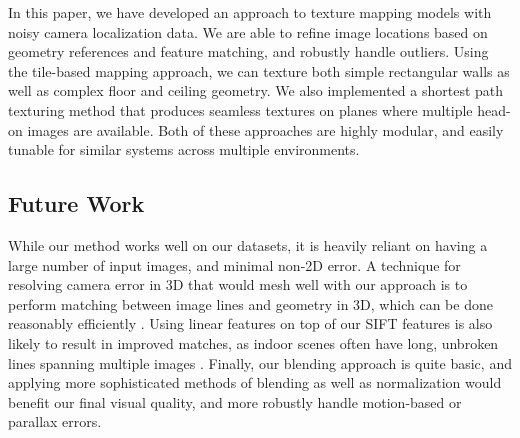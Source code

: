 \documentclass[]{spie}  %
\begin{document}
In this paper, we have developed an approach to texture mapping models
with noisy camera localization data. We are able to refine image
locations based on geometry references and feature matching, and
robustly handle outliers. Using the tile-based mapping approach, we
can texture both simple rectangular walls as well as complex floor and
ceiling geometry. We also implemented a shortest path texturing method
that produces seamless textures on planes where multiple head-on
images are available. Both of these approaches are highly modular, and
easily tunable for similar systems across multiple environments.

\subsection{Future Work}
While our method works well on our datasets, it is heavily reliant on
having a large number of input images, and minimal non-2D error. A
technique for resolving camera error in 3D that would mesh well with
our approach is to perform matching between image lines and geometry
in 3D, which can be done reasonably efficiently \cite{linebased,
  rectangularstructures}. Using linear features on top of our SIFT
features is also likely to result in improved matches, as indoor
scenes often have long, unbroken lines spanning multiple images
\cite{linearposeestimation}. Finally, our blending approach is quite
basic, and applying more sophisticated methods of blending as well as
normalization would benefit our final visual quality, and more
robustly handle motion-based or parallax errors.
\end{document}
